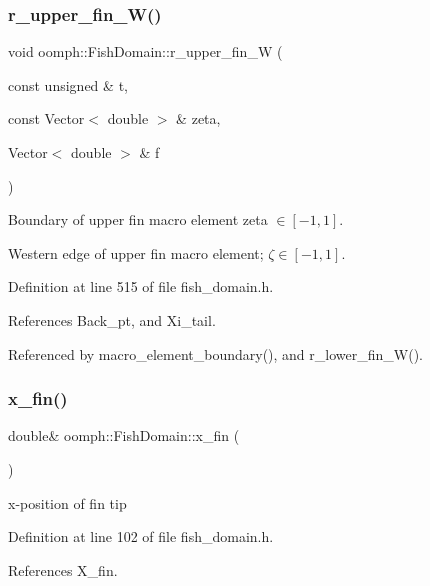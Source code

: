 \subsubsection{\texorpdfstring{r\+\_\+upper\+\_\+fin\+\_\+\+W()}{r\_upper\_fin\_W()}}
{\footnotesize\ttfamily void oomph\+::\+Fish\+Domain\+::r\+\_\+upper\+\_\+fin\+\_\+W (\begin{DoxyParamCaption}\item[{const unsigned \&}]{t,  }\item[{const Vector$<$ double $>$ \&}]{zeta,  }\item[{Vector$<$ double $>$ \&}]{f }\end{DoxyParamCaption})\hspace{0.3cm}{\ttfamily [private]}}



Boundary of upper fin macro element zeta $ \in [-1,1] $. 

Western edge of upper fin macro element; $ \zeta \in [-1,1] $. 

Definition at line 515 of file fish\+\_\+domain.\+h.



References Back\+\_\+pt, and Xi\+\_\+tail.



Referenced by macro\+\_\+element\+\_\+boundary(), and r\+\_\+lower\+\_\+fin\+\_\+\+W().

\mbox{\label{classoomph_1_1FishDomain_ae5343cbda69a625a56a7949edd43cad4}} 
\subsubsection{\texorpdfstring{x\+\_\+fin()}{x\_fin()}}
{\footnotesize\ttfamily double\& oomph\+::\+Fish\+Domain\+::x\+\_\+fin (\begin{DoxyParamCaption}{ }\end{DoxyParamCaption})\hspace{0.3cm}{\ttfamily [inline]}}



x-\/position of fin tip 



Definition at line 102 of file fish\+\_\+domain.\+h.



References X\+\_\+fin.



